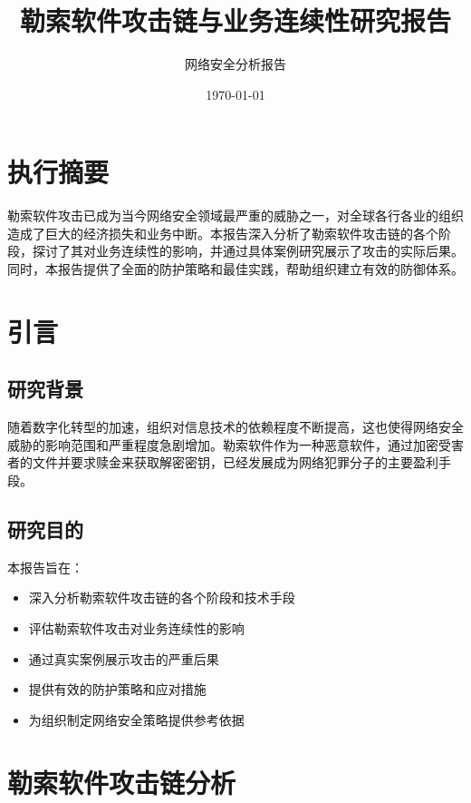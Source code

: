 \documentclass[12pt,a4paper]{article}
\title{\textbf{\Huge 勒索软件攻击链与业务连续性研究报告}}
\author{网络安全分析报告}
\date{\today}
\begin{document}
\maketitle

\newpage

\tableofcontents

\newpage

\section{执行摘要}

勒索软件攻击已成为当今网络安全领域最严重的威胁之一，对全球各行各业的组织造成了巨大的经济损失和业务中断。本报告深入分析了勒索软件攻击链的各个阶段，探讨了其对业务连续性的影响，并通过具体案例研究展示了攻击的实际后果。同时，本报告提供了全面的防护策略和最佳实践，帮助组织建立有效的防御体系。

\section{引言}

\subsection{研究背景}

随着数字化转型的加速，组织对信息技术的依赖程度不断提高，这也使得网络安全威胁的影响范围和严重程度急剧增加。勒索软件作为一种恶意软件，通过加密受害者的文件并要求赎金来获取解密密钥，已经发展成为网络犯罪分子的主要盈利手段。

\subsection{研究目的}

本报告旨在：
\begin{itemize}
    \item 深入分析勒索软件攻击链的各个阶段和技术手段
    \item 评估勒索软件攻击对业务连续性的影响
    \item 通过真实案例展示攻击的严重后果
    \item 提供有效的防护策略和应对措施
    \item 为组织制定网络安全策略提供参考依据
\end{itemize}

\section{勒索软件攻击链分析}
\end{document}
